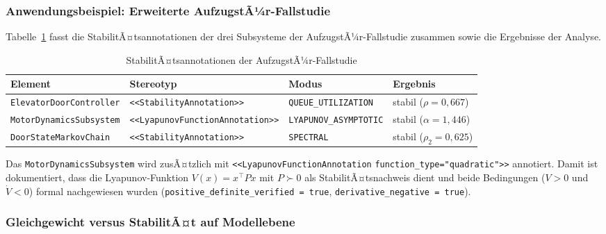﻿\documentclass[a4paper,12pt]{scrreprt}
\theoremstyle{definition}
\begin{document}
\subsubsection{Anwendungsbeispiel: Erweiterte AufzugstÃ¼r-Fallstudie}

Tabelle~\ref{tab:elevator-stability} fasst die StabilitÃ¤tsannotationen der
drei Subsysteme der AufzugstÃ¼r-Fallstudie zusammen sowie die Ergebnisse der
Analyse.

\begin{table}
	\centering
	\begin{tabular}{@{}llll@{}}
		\toprule
		\textbf{Element} & \textbf{Stereotyp} & \textbf{Modus}
		& \textbf{Ergebnis} \\
		\midrule
		\texttt{ElevatorDoor}\newline\texttt{Controller}
		& \texttt{<<Stability}\newline\texttt{Annotation>>}
		& \texttt{QUEUE\_}\newline\texttt{UTILIZATION}
		& stabil ($\rho = 0{,}667$) \\[6pt]
		\texttt{MotorDynamics}\newline\texttt{Subsystem}
		& \texttt{<<Lyapunov}\newline\texttt{FunctionAnnotation>>}
		& \texttt{LYAPUNOV\_}\newline\texttt{ASYMPTOTIC}
		& stabil ($\alpha = 1{,}446$) \\[6pt]
		\texttt{DoorState}\newline\texttt{MarkovChain}
		& \texttt{<<Stability}\newline\texttt{Annotation>>}
		& \texttt{SPECTRAL}
		& stabil ($\rho_2 = 0{,}625$) \\
		\bottomrule
	\end{tabular}
	\caption{StabilitÃ¤tsannotationen der AufzugstÃ¼r-Fallstudie}
	\label{tab:elevator-stability}
\end{table}

Das \texttt{MotorDynamicsSubsystem} wird zusÃ¤tzlich mit
\texttt{<<LyapunovFunctionAnno\newline tation} \texttt{function\_type="quadratic">>}
annotiert. Damit ist dokumentiert, dass die Lyapunov-Funktion
$V(x) = x^\top P x$ mit $P \succ 0$ als StabilitÃ¤tsnachweis dient und
beide Bedingungen ($V > 0$ und $\dot{V} < 0$) formal nachgewiesen wurden
(\texttt{positive\_definite\_veri\newline fied = true},
\texttt{derivative\_negative = true}).

\subsubsection{Gleichgewicht versus StabilitÃ¤t auf Modellebene}
\end{document}
